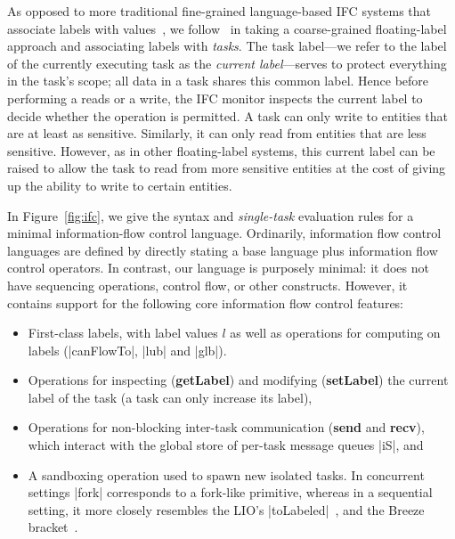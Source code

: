 As opposed to more traditional fine-grained language-based IFC systems that
associate labels with values~\cite{sabelfeld2003language,
Austin:Flanagan:PLAS09}, we follow~\cite{Zeldovich:2006, lio} in taking a
coarse-grained floating-label approach and associating labels with
\emph{tasks}.
%
The task label---we refer to the label of the currently executing task as the
\emph{current label}---serves to protect everything in the task's scope;
all data in a task shares this common label.
%
Hence before performing a reads or a write, the IFC monitor inspects the
current label to decide whether the operation is permitted.
%
A task can only write to entities that are at least as sensitive.
%
Similarly, it can only read from entities that are less sensitive.
%
However, as in other floating-label systems, this current label can be raised
to allow the task to read from more sensitive entities at the cost of giving up
the ability to write to certain entities.

In Figure~\ref{fig:ifc}, we give the syntax and \emph{single-task}
evaluation rules for a minimal information-flow control language.  
Ordinarily, information flow control languages are defined by directly
stating a base language plus information flow control operators.  In
contrast, our language is purposely minimal: it does not have sequencing
operations, control flow, or other constructs.  However, it contains
support for the following core information flow control features:

\begin{itemize}
    \item First-class labels, with label values $l$ as well as operations for computing on
labels (|canFlowTo|, |lub| and |glb|).
    \item Operations for inspecting (\textbf{getLabel}) and modifying
    (\textbf{setLabel}) the current label of the task (a task can only increase its label),
    \item Operations for non-blocking inter-task communication (\textbf{send}
    and \textbf{recv}), which interact with the global store of per-task
    message queues |iS|, and
    \item A sandboxing operation used to spawn new isolated tasks. In
    concurrent settings |fork| corresponds to a fork-like primitive,
    whereas in a
    sequential setting, it more closely resembles the LIO's
    |toLabeled|~\cite{lio}, and the Breeze
    bracket~\cite{Hritcu:2013:YIB:2497621.2498098}.
\end{itemize}

